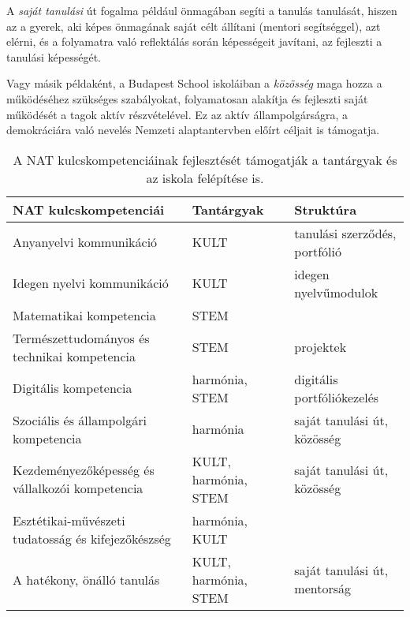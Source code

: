 A \emph{saját tanulási} út fogalma például önmagában segíti a tanulás
tanulását, hiszen az a gyerek, aki képes önmagának saját célt állítani (mentori
segítséggel), azt elérni, és a folyamatra való reflektálás során képességeit
javítani, az fejleszti a tanulási képességét.

Vagy másik példaként, a Budapest School iskoláiban a \emph{közösség} maga hozza
a működéséhez szükséges szabályokat, folyamatosan alakítja és fejleszti saját
működését a tagok aktív részvételével. Ez az aktív állampolgárságra, a
demokráciára való nevelés Nemzeti alaptantervben előírt céljait is támogatja.

\begin{table}
  \centering
  \begin{tabular}{p{5cm}|>{\raggedright}p{3cm}|p{3cm}}

    \textbf{NAT kulcskompetenciái}                     & \textbf{Tantárgyak}  &
    \textbf{Struktúra}                                                                                        \\ \hline
    Anyanyelvi kommunikáció                            &  KULT                & tanulási szerződés, portfólió \\ \hline
    Idegen nyelvi kommunikáció                         & KULT                 & idegen nyelvű\hfill\break modulok          \\ \hline
    Matematikai kompetencia                            & STEM                 &                               \\ \hline
    Természettudományos és technikai kompetencia       & STEM                 & projektek                     \\ \hline
    Digitális kompetencia                              & harmónia, STEM       & digitális portfóliókezelés   \\ \hline
    Szociális és állampolgári kompetencia              & harmónia             & saját tanulási út,
    közösség                                                                                                  \\ \hline
    Kezdeményezőképesség és vállalkozói kompetencia    & KULT, harmónia, STEM & saját
    tanulási út, közösség                                                                                     \\ \hline
    Esztétikai-művészeti tudatosság és kifejezőkészség & harmónia, KULT       &                               \\ \hline
    A hatékony, önálló tanulás                         & KULT, harmónia, STEM & saját tanulási út,
    mentorság                                                                                                 \\

  \end{tabular}
  \caption{A NAT kulcskompetenciáinak fejlesztését támogatják a tantárgyak és
    az iskola felépítése is.}
  \label{tbl:nat_kulcs}
\end{table}